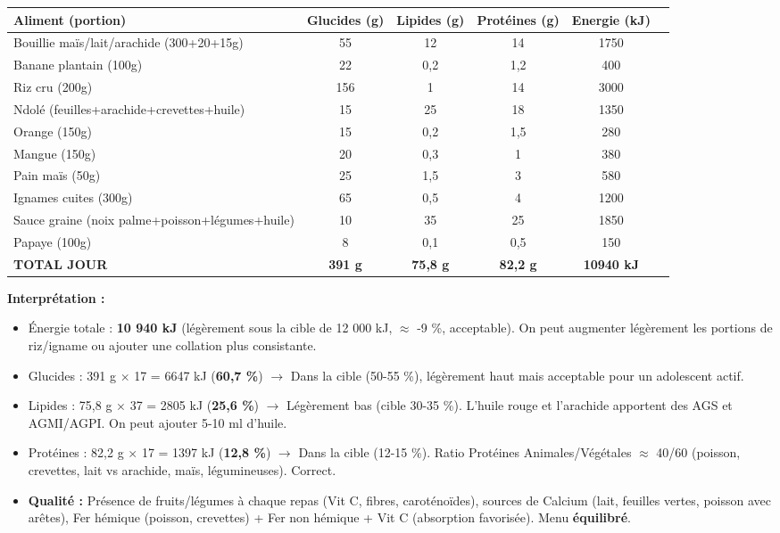 \documentclass[11pt]{article}
\begin{document}
\begin{exoresolu}
\begin{center}
\begin{tabular}{|l|cccc|c|}\hline
\textbf{Aliment (portion)} & \textbf{Glucides (g)} & \textbf{Lipides (g)} & \textbf{Protéines (g)} & \textbf{Energie (kJ)} \\ \hline
Bouillie maïs/lait/arachide (300+20+15g) & 55 & 12 & 14 & 1750 \\
Banane plantain (100g) & 22 & 0,2 & 1,2 & 400 \\
Riz cru (200g) & 156 & 1 & 14 & 3000 \\
Ndolé (feuilles+arachide+crevettes+huile) & 15 & 25 & 18 & 1350 \\
Orange (150g) & 15 & 0,2 & 1,5 & 280 \\
Mangue (150g) & 20 & 0,3 & 1 & 380 \\
Pain maïs (50g) & 25 & 1,5 & 3 & 580 \\
Ignames cuites (300g) & 65 & 0,5 & 4 & 1200 \\
Sauce graine (noix palme+poisson+légumes+huile) & 10 & 35 & 25 & 1850 \\
Papaye (100g) & 8 & 0,1 & 0,5 & 150 \\ \hline
\textbf{TOTAL JOUR} & \textbf{391 g} & \textbf{75,8 g} & \textbf{82,2 g} & \textbf{10940 kJ} \\ \hline
\end{tabular}
\end{center}

\textbf{Interprétation :}
\begin{itemize}
    \item Énergie totale : \textbf{10 940 kJ} (légèrement sous la cible de 12 000 kJ, $\approx$ -9 \%, acceptable). On peut augmenter légèrement les portions de riz/igname ou ajouter une collation plus consistante.
    \item Glucides : 391 g $\times$ 17 = 6647 kJ (\textbf{60,7 \%}) $\rightarrow$ Dans la cible (50-55 \%), légèrement haut mais acceptable pour un adolescent actif.
    \item Lipides : 75,8 g $\times$ 37 = 2805 kJ (\textbf{25,6 \%}) $\rightarrow$ Légèrement bas (cible 30-35 \%). L'huile rouge et l'arachide apportent des AGS et AGMI/AGPI. On peut ajouter 5-10 ml d'huile.
    \item Protéines : 82,2 g $\times$ 17 = 1397 kJ (\textbf{12,8 \%}) $\rightarrow$ Dans la cible (12-15 \%). Ratio Protéines Animales/Végétales $\approx$ 40/60 (poisson, crevettes, lait vs arachide, maïs, légumineuses). Correct.
    \item \textbf{Qualité :} Présence de fruits/légumes à chaque repas (Vit C, fibres, caroténoïdes), sources de Calcium (lait, feuilles vertes, poisson avec arêtes), Fer hémique (poisson, crevettes) + Fer non hémique + Vit C (absorption favorisée). Menu \textbf{équilibré}.
\end{itemize}
\end{exoresolu}
\end{document}
